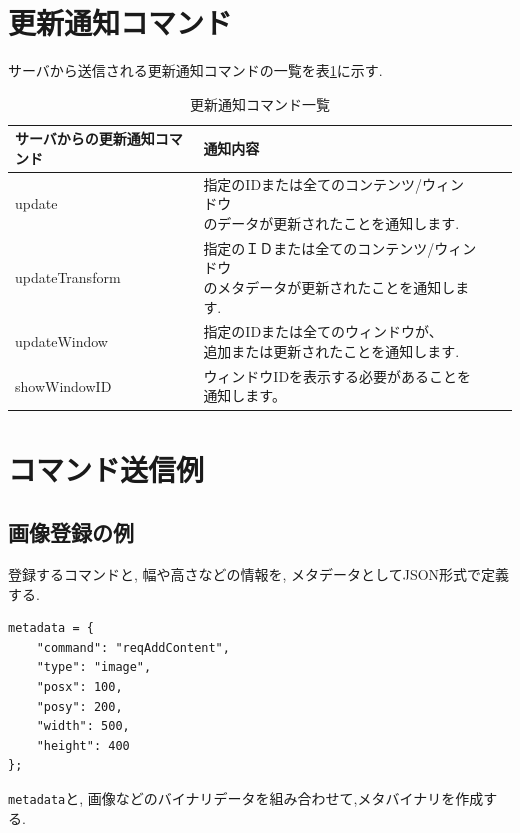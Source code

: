 \documentclass[a4paper,10pt,oneside]{jsbook}
\begin{document}
\newpage

\section{更新通知コマンド}

サーバから送信される更新通知コマンドの一覧を表\ref{responsecommands}に示す.

\begin{table}[htbp]
\begin{center}
\caption{更新通知コマンド一覧}
\label{responsecommands}
\begin{tabular}{|l|l|l|l|}
\hline
サーバからの更新通知コマンド	  & 通知内容 \\
\hline
\hline
update & \shortstack[l]{指定のIDまたは全てのコンテンツ/ウィンドウ \\ のデータが更新されたことを通知します.} \\
\hline
updateTransform & \shortstack[l]{指定のＩＤまたは全てのコンテンツ/ウィンドウ\\のメタデータが更新されたことを通知します.} \\
\hline
updateWindow & \shortstack[l]{指定のIDまたは全てのウィンドウが、\\ 追加または更新されたことを通知します.} \\
\hline
showWindowID & ウィンドウIDを表示する必要があることを通知します。\\
\hline

\end{tabular}
\end{center}
\end{table}

\newpage

\section{コマンド送信例}
\subsection{画像登録の例}

登録するコマンドと, 幅や高さなどの情報を, メタデータとしてJSON形式で定義する.

\begin{verbatim}
metadata = {
    "command": "reqAddContent", 
    "type": "image", 
    "posx": 100, 
    "posy": 200, 
    "width": 500,
    "height": 400 
};
\end{verbatim}

\verb+metadata+と, 画像などのバイナリデータを組み合わせて,メタバイナリを作成する. 
\end{document}
